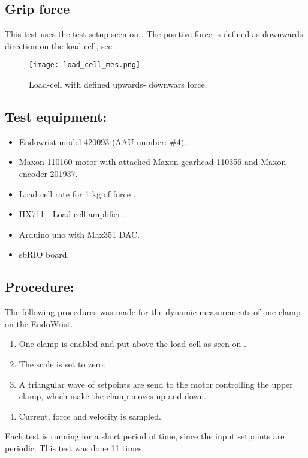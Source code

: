 \subsection{Grip force} %

This test uses the test setup seen on . The positive force is defined as downwards direction on the load-cell, see .

\begin{figure}[H]
	\centering
	\texttt{[image: load\_cell\_mes.png]}
	\caption{Load-cell with defined upwards- downwars force.}
	\label{fig:mes_up_down1}
\end{figure}


\subsection*{Test equipment:}
\begin{itemize}
\item Endowrist model 420093 (AAU number: \#4).
\item Maxon 110160 motor with attached Maxon gearhead 110356 and Maxon encoder 201937.
\item Load cell rate for 1 kg of force \cite{Load_cell_1kg}.
\item HX711 - Load cell amplifier \cite{HX711}.
\item Arduino uno with Max351 DAC.
\item sbRIO board.
\end{itemize}

\subsection*{Procedure:}
The following procedures was made for the dynamic measurements of one clamp on the EndoWrist.

\begin{enumerate}
\item One clamp is enabled and put above the load-cell as seen on .
\item The scale is set to zero.
\item A triangular wave of setpoints are send to the motor controlling the upper clamp, which make the clamp moves up and down.
\item Current, force and velocity is sampled.
\end{enumerate}
Each test is running for a short period of time, since the input setpoints are periodic. This test was done 11 times.

